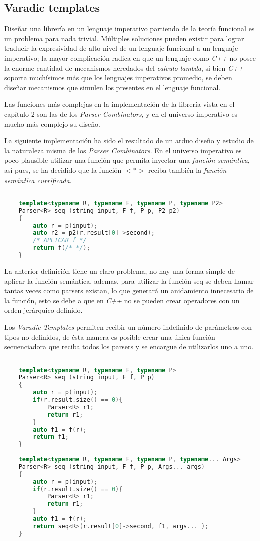 	\subsection{Varadic templates}
	Diseñar una librería en un lenguaje imperativo partiendo de la teoría funcional es un problema para nada trivial. Múltiples soluciones pueden existir para lograr traducir la expresividad de alto nivel de un lenguaje funcional a un lenguaje imperativo; la mayor complicación radica en que un lenguaje como \emph{C++} no posee la enorme cantidad de mecanismos heredados del \emph{calculo lambda}, si bien \emph{C++} soporta muchísimos más que los lenguajes imperativos promedio, se deben diseñar mecanismos que simulen los presentes en el lenguaje funcional. 

	Las funciones más complejas en la implementación de la librería vista en el capítulo 2 son las de los \emph{Parser Combinators}, y en el universo imperativo es mucho más complejo su diseño.
	
	La siguiente implementación ha sido el resultado de un arduo diseño y estudio de la naturaleza misma de los \emph{Parser Combinators}. En el universo imperativo es poco plausible utilizar una función que permita inyectar una \emph{función semántica}, así pues, se ha decidido que la función $<*>$ reciba también la \emph{función semántica currificada}.
	
	\begin{lstlisting}[language=C++, caption=función secuenciadora en C++]
	
	template<typename R, typename F, typename P, typename P2>
	Parser<R> seq (string input, F f, P p, P2 p2)
	{
		auto r = p(input);
		auto r2 = p2(r.result[0]->second);
		/* APLICAR f */
		return f(/* */);
	}	
	\end{lstlisting}
	
	La anterior definición tiene un claro problema, no hay una forma simple de aplicar la función semántica, ademas, para utilizar la función seq se deben llamar tantas veces como parsers existan, lo que generará un anidamiento innecesario de la función, esto se debe a que en \emph{C++} no se pueden crear operadores con un orden jerárquico definido.
	
	Los \emph{Varadic Templates} permiten recibir un número indefinido de parámetros con tipos no definidos, de ésta manera es posible crear una única función secuenciadora que reciba todos los parsers y se encargue de utilizarlos uno a uno.
	
	\begin{lstlisting}[language=C++, caption=función secuenciadora en C++]
	
	template<typename R, typename F, typename P>
	Parser<R> seq (string input, F f, P p)
	{
		auto r = p(input);
		if(r.result.size() == 0){
			Parser<R> r1;
			return r1;
		}		
		auto f1 = f(r);
		return f1;
	}
	
	template<typename R, typename F, typename P, typename... Args>
	Parser<R> seq (string input, F f, P p, Args... args)
	{
		auto r = p(input);
		if(r.result.size() == 0){
			Parser<R> r1;
			return r1;
		}
		auto f1 = f(r);
		return seq<R>(r.result[0]->second, f1, args... );
	}	
	\end{lstlisting}
	

